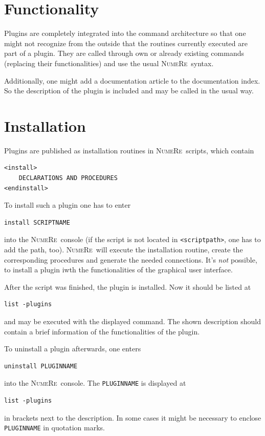 \documentclass[DIV=14,headsepline,footsepline]{scrbook}
\newcommand{\NR}{\textsc{Nu\-me\-Re}}
\begin{document}
			\section{Functionality}
				Plugins are completely integrated into the command architecture so that one might not recognize from the outside that the routines currently executed are part of a plugin. They are called through own or already existing commands (replacing their functionalities) and use the usual \NR\ syntax.
				
				Additionally, one might add a documentation article to the documentation index. So the description of the plugin is included and may be called in the usual way.
			\section{Installation}
				Plugins are published as installation routines in \NR\ scripts, which contain
				\begin{lstlisting}
<install>
	DECLARATIONS AND PROCEDURES
<endinstall>
				\end{lstlisting}
				To install such a plugin one has to enter
				\begin{lstlisting}
install SCRIPTNAME
				\end{lstlisting}
				into the \NR\ console (if the script is not located in \verb+<scriptpath>+, one has to add the path, too). \NR\ will execute the installation routine, create the corresponding procedures and generate the needed connections. It's \emph{not} possible, to install a plugin iwth the functionalities of the graphical user interface.
				
				After the script was finished, the plugin is installed. Now it should be listed at
				\begin{lstlisting}
list -plugins
				\end{lstlisting}
				and may be executed with the displayed command. The shown description should contain a brief information of the functionalities of the plugin.
				
				To uninstall a plugin afterwards, one enters
				\begin{lstlisting}
uninstall PLUGINNAME
				\end{lstlisting}
				into the \NR\ console. The \verb+PLUGINNAME+ is displayed at
				\begin{lstlisting}
list -plugins
				\end{lstlisting}
				in brackets next to the description. In some cases it might be necessary to enclose \verb+PLUGINNAME+ in quotation marks.
\end{document}
